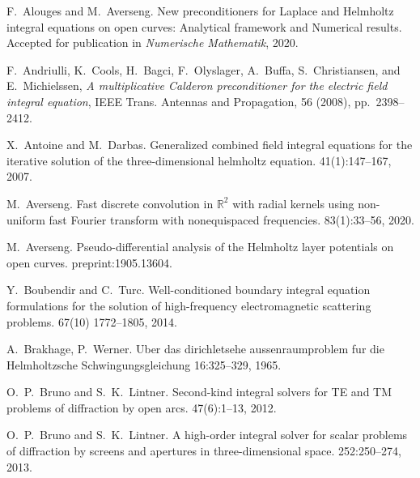 \documentclass[]{report}
\begin{document}
\begin{small}
  \begin{thebibliography}{0}
		
		F.~Alouges and M.~Averseng.
		\newblock New preconditioners for Laplace and Helmholtz integral equations on open curves: Analytical framework and Numerical results. 
		\newblock Accepted for publication in {\em Numerische Mathematik}, 2020.

{\sc F.~Andriulli, K.~Cools, H.~Bagci, F.~Olyslager, A.~Buffa, S.~Christiansen,
  and E.~Michielssen}, {\em A multiplicative {C}alderon preconditioner for the
  electric field integral equation}, IEEE Trans. Antennas and Propagation, 56
  (2008), pp.~2398--2412.
                
		X.~Antoine and M.~Darbas.
		\newblock Generalized combined field integral equations for the iterative
		solution of the three-dimensional helmholtz equation.
		41(1):147--167, 2007.
		
		M.~Averseng.
		\newblock Fast discrete convolution in $\mathbb {R}^{2} $ with radial kernels using non-uniform fast Fourier transform with nonequispaced frequencies. 
		 83(1):33--56, 2020.
		
		M.~Averseng. 
		\newblock Pseudo-differential analysis of the Helmholtz layer potentials on open curves. 
		 preprint:1905.13604.
		
		Y.~Boubendir and C.~Turc.
		\newblock Well-conditioned boundary integral equation formulations for the solution of high-frequency electromagnetic scattering problems.
		 67(10) 1772--1805, 2014.
		
		A.~Brakhage, P.~Werner.
		\newblock Uber das dirichletsehe aussenraumproblem fur die Helmholtzsche Schwingungsgleichung
		 16:325–329, 1965.
		
		O.~P.~Bruno and S.~K.~Lintner.
		\newblock Second-kind integral solvers for TE and TM problems of diffraction by open arcs.
		 47(6):1--13, 2012.
		
		O.~P.~Bruno and S.~K.~Lintner.
		A high-order integral solver for scalar problems of diffraction by screens and apertures in three-dimensional space.
		 252:250--274, 2013.


\end{thebibliography}
\end{small}
\end{document}
